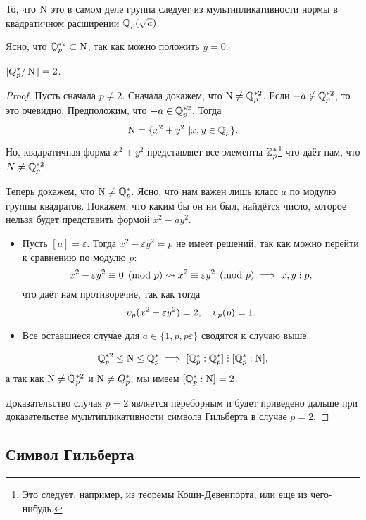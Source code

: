 	\begin{remark}
		То, что $\operatorname{\mathrm{N}}$ это в самом деле группа следует из мультипликативности нормы в квадратичном расширении $\mathbb{Q}_{p}(\sqrt{a})$.
	\end{remark}

	Ясно, что $\mathbb{Q}_{p}^{*2} \subset \operatorname{\mathrm{N}}$, так как можно положить $y = 0$. 

	\begin{statement}\label{index_norm_group}
		 $|Q_{p}^{*}/\operatorname{\mathrm{N}}| = 2$.
	\end{statement}
	\begin{proof}
		Пусть сначала $p \neq 2$. Сначала докажем, что $\operatorname{\mathrm{N}} \neq \mathbb{Q}^{*2}_{p}$. Если $-a \notin \mathbb{Q}_{p}^{*2}$, то это очевидно. Предположим, что $-a \in \mathbb{Q}_{p}^{*2}$. Тогда 
		\[
			\operatorname{\mathrm{N}} = \{ x^2 + y^2 \ \vert x, y \in \mathbb{Q}_{p} \}. 
		\]
		Но, квадратичная форма $x^2 + y^2$ представляет все элементы $\mathbb{Z}_{p}^{*}$\footnote{Это следует, например, из теоремы Коши-Девенпорта, или еще из чего-нибудь.} что даёт нам, что $N \neq \mathbb{Q}_{p}^{*2}$. 

		Теперь докажем, что  $\operatorname{\mathrm{N}} \neq \mathbb{Q}_{p}^{*}$. Ясно, что нам важен лишь класс $a$ по модулю группы квадратов. Покажем, что каким бы он ни был, найдётся число, которое нельзя будет представить формой $x^2 - ay^2$. 
		\begin{itemize}
			\item Пусть $[a] = \varepsilon$. Тогда  $x^2 - \varepsilon y^2 = p$ не имеет решений, так как можно перейти к сравнению по модулю $p$:
			\[
				x^{2} - \varepsilon y^2 \equiv 0 \pmod{p} \rightsquigarrow x^2 \equiv \varepsilon y^2 \pmod{p} \implies x, y \divby p,
			\]
			что даёт нам противоречие, так как тогда 
			\[
				\upsilon_{p}(x^2 - \varepsilon y^2) = 2, \quad \upsilon_{p}(p) = 1.  
			\]
			\item Все оставшиеся случае для $a \in \{1, p, p \varepsilon \}$ сводятся к случаю выше. 
		\end{itemize}

		\[
			\Q_{p}^{*2} \le \Nm \le \Q_{p}^{*} \implies [\Q_{p}^{*} : \Q_p^{*}] \divby [\Q_{p}^{*} : \Nm],
		\]
		а так как $\operatorname{\mathrm{N}} \neq \mathbb{Q}^{*2}_{p}$ и $\operatorname{\mathrm{N}} \neq Q^{*}_{p}$,  мы имеем $[\mathbb{Q}_{p}^{*} : \operatorname{\mathrm{N}}] = 2$. 

		Доказательство случая $p = 2$ является переборным и будет приведено дальше при доказательстве мультипликативности символа Гильберта в случае $p = 2$.
	\end{proof}

	\subsection{Символ Гильберта}

